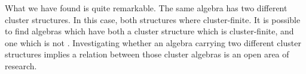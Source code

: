 What we have found is quite remarkable. The same algebra has two different cluster
structures. In this case, both structures where cluster-finite. It is possible to find
algebras which have both a cluster structure which is cluster-finite, and one which is
not \cite[Remark 6.3.3]{FominWilliams2021IntroductionCA_6}. Investigating whether an
algebra carrying two different cluster structures implies a relation between those
cluster algebras is an open area of research.
%